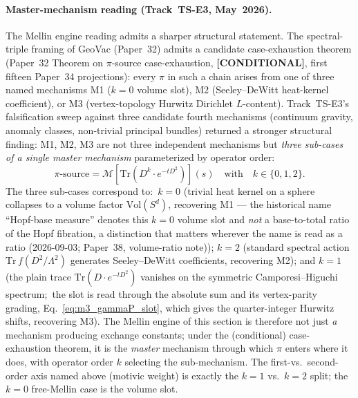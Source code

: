 \documentclass[aps,pra,twocolumn,superscriptaddress,longbibliography]{revtex4-2}
\begin{document}
\paragraph{Master-mechanism reading (Track~TS-E3, May~2026).}
The Mellin engine reading admits a sharper structural statement.  The
spectral-triple framing of GeoVac (Paper~32) admits a candidate
case-exhaustion theorem (Paper~32 Theorem on $\pi$-source
case-exhaustion, \textbf{[CONDITIONAL]}, first fifteen Paper~34
projections): every $\pi$ in such a chain arises from one of three
named mechanisms M1 ($k = 0$ volume slot), M2 (Seeley--DeWitt
heat-kernel coefficient), or M3 (vertex-topology Hurwitz Dirichlet
$L$-content).  Track~TS-E3's falsification sweep against three
candidate fourth mechanisms (continuum gravity, anomaly classes,
non-trivial principal bundles) returned a stronger structural finding:
M1, M2, M3 are not three independent mechanisms but \emph{three sub-cases
of a single master mechanism} parameterized by operator order:
\begin{equation}
\label{eq:master_mellin}
\pi\text{-source} = \mathcal{M}\!\left[ \mathrm{Tr}(D^k \cdot e^{-tD^2}) \right](s)
\quad\text{with}\quad k \in \{0, 1, 2\}.
\end{equation}
The three sub-cases correspond to:\ $k = 0$ (trivial heat kernel on a
sphere collapses to a volume factor $\mathrm{Vol}(S^d)$, recovering
M1 --- the historical name ``Hopf-base measure'' denotes this $k = 0$ volume
slot and \emph{not} a base-to-total ratio of the Hopf fibration, a
distinction that matters wherever the name is read as a ratio
(2026-09-03; Paper~38, volume-ratio note)); $k = 2$ (standard spectral action $\mathrm{Tr}\,f(D^2/\Lambda^2)$
generates Seeley--DeWitt coefficients, recovering M2); and $k = 1$
(the plain trace $\mathrm{Tr}(D \cdot e^{-tD^2})$ vanishes on the symmetric
Camporesi--Higuchi spectrum;\ the slot is read through the absolute sum and its
vertex-parity grading, Eq.~\eqref{eq:m3_gammaP_slot}, which gives the quarter-integer
Hurwitz shifts, recovering M3).  The Mellin engine of
this section is therefore not just \emph{a} mechanism producing
exchange constants; under the (conditional) case-exhaustion theorem,
it is the \emph{master} mechanism through which $\pi$ enters where it
does, with operator order $k$
selecting the sub-mechanism.  The first-vs.\ second-order axis named
above (motivic weight) is exactly the $k = 1$ vs.\ $k = 2$ split; the
$k = 0$ free-Mellin case is the volume slot.
\end{document}

